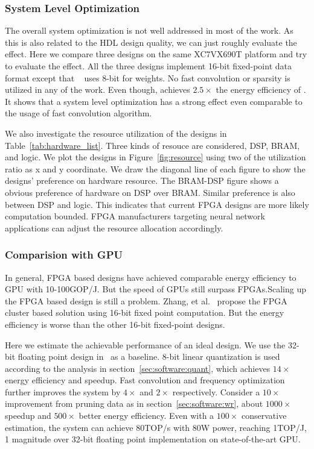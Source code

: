 \subsubsection*{\textbf{System Level Optimization}} The overall system optimization is not well addressed in most of the work. As this is also related to the HDL design quality, we can just roughly evaluate the effect. Here we compare three designs\cite{zhang2016caffeine, liu2016automatic, li2016high} on the same XC7VX690T platform and try to evaluate the effect. All the three designs implement 16-bit fixed-point data format except that ~\cite{liu2016automatic} uses 8-bit for weights. No fast convolution or sparsity is utilized in any of the work. Even though, \cite{li2016high} achieves $2.5\times$ the energy efficiency of \cite{liu2016automatic}. It shows that a system level optimization has a strong effect even comparable to the usage of fast convolution algorithm. 

We also investigate the resource utilization of the designs in Table~\ref{tab:hardware_list}. Three kinds of resouce are considered, DSP, BRAM, and logic. We plot the designs in Figure~\ref{fig:resource} using two of the utilization ratio as x and y coordinate. We draw the diagonal line of each figure to show the designs' preference on hardware resource. The BRAM-DSP figure shows a obvious preference of hardware on DSP over BRAM. Similar preference is also between DSP and logic. This indicates that current FPGA designs are more likely computation bounded. FPGA manufacturers targeting neural network applications can adjust the resource allocation accordingly.

\subsubsection*{\textbf{Comparision with GPU}} In general, FPGA based designs have achieved comparable energy efficiency to GPU with 10-100GOP/J. But the speed of GPUs still surpass FPGAs.Scaling up the FPGA based design is still a problem. Zhang, et al.~\cite{zhang2016energy} propose the FPGA cluster based solution using 16-bit fixed point computation. But the energy efficiency is worse than the other 16-bit fixed-point designs. 

Here we estimate the achievable performance of an ideal design. We use the 32-bit floating point design in~\cite{zhang2017improving} as a baseline. 8-bit linear quantization is used according to the analysis in section~\ref{sec:software:quant}, which achieves $14\times$ energy efficiency and speedup. Fast convolution and frequency optimization further improves the system by $4\times$ and $2\times$ respectively. Consider a $10\times$ improvement from pruning data as in section~\ref{sec:software:wr}, about $1000\times$ speedup and $500\times$ better energy efficiency. Even with a $100\times$ conservative estimation, the system can achieve  80TOP/s with 80W power, reaching 1TOP/J, 1 magnitude over 32-bit floating point implementation on state-of-the-art GPU. 

